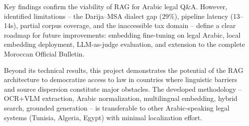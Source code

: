 Key findings confirm the viability of RAG for Arabic legal Q\&A. However,
identified limitations -- the Darija--MSA dialect gap (29\%), pipeline
latency (13--14s), partial corpus coverage, and the inaccessible tax domain
-- define a clear roadmap for future improvements: embedding fine-tuning
on legal Arabic, local embedding deployment, LLM-as-judge evaluation, and
extension to the complete Moroccan Official Bulletin.

Beyond its technical results, this project demonstrates the potential of
the RAG architecture to democratize access to law in countries where
linguistic barriers and source dispersion constitute major obstacles. The
developed methodology -- OCR+VLM extraction, Arabic normalization,
multilingual embedding, hybrid search, grounded generation -- is
transferable to other Arabic-speaking legal systems (Tunisia, Algeria,
Egypt) with minimal localization effort.

